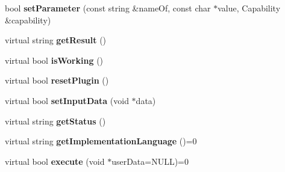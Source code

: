 \begin{DoxyCompactItemize}
\item 
\hypertarget{classrr_1_1_plugin_a91e2e334ade17946fb12df44f1732688}{bool {\bfseries set\-Parameter} (const string \&name\-Of, const char $\ast$value, Capability \&capability)}\label{classrr_1_1_plugin_a91e2e334ade17946fb12df44f1732688}

\item 
\hypertarget{classrr_1_1_plugin_a63180ee780e5e179c459e31313235a79}{virtual string {\bfseries get\-Result} ()}\label{classrr_1_1_plugin_a63180ee780e5e179c459e31313235a79}

\item 
\hypertarget{classrr_1_1_plugin_a4d9627a684135148b2c457c88f32b25f}{virtual bool {\bfseries is\-Working} ()}\label{classrr_1_1_plugin_a4d9627a684135148b2c457c88f32b25f}

\item 
\hypertarget{classrr_1_1_plugin_ad3f38921dfb4decba879459d224aff4d}{virtual bool {\bfseries reset\-Plugin} ()}\label{classrr_1_1_plugin_ad3f38921dfb4decba879459d224aff4d}

\item 
\hypertarget{classrr_1_1_plugin_af28c63b9929828bc4d6d9657ae1e2713}{virtual bool {\bfseries set\-Input\-Data} (void $\ast$data)}\label{classrr_1_1_plugin_af28c63b9929828bc4d6d9657ae1e2713}

\item 
\hypertarget{classrr_1_1_plugin_a4691faf01e218ea1b9db04c85cc120bc}{virtual string {\bfseries get\-Status} ()}\label{classrr_1_1_plugin_a4691faf01e218ea1b9db04c85cc120bc}

\item 
\hypertarget{classrr_1_1_plugin_af7c75fd22edfe52cf8c25624add94d41}{virtual string {\bfseries get\-Implementation\-Language} ()=0}\label{classrr_1_1_plugin_af7c75fd22edfe52cf8c25624add94d41}

\item 
\hypertarget{classrr_1_1_plugin_abe6a030d65e56666bbf92a0d0c9e9f04}{virtual bool {\bfseries execute} (void $\ast$user\-Data=N\-U\-L\-L)=0}\label{classrr_1_1_plugin_abe6a030d65e56666bbf92a0d0c9e9f04}

\end{DoxyCompactItemize}
